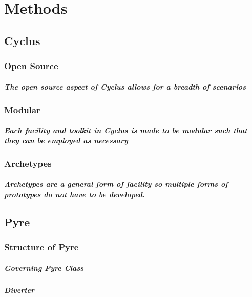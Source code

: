 \chapter[Methods]{Methods}
\section{Cyclus}
\subsection{Open Source}

\paragraph{The open source aspect of Cyclus allows for a breadth of scenarios}

\subsection{Modular}

\paragraph{Each facility and toolkit in Cyclus is made to be modular such that they can be employed as necessary}

\subsection{Archetypes}

\paragraph{Archetypes are a general form of facility so multiple forms of prototypes do not have to be developed.}

\section{Pyre}

\subsection{Structure of Pyre}
\paragraph{Governing Pyre Class}

\paragraph{Diverter}

